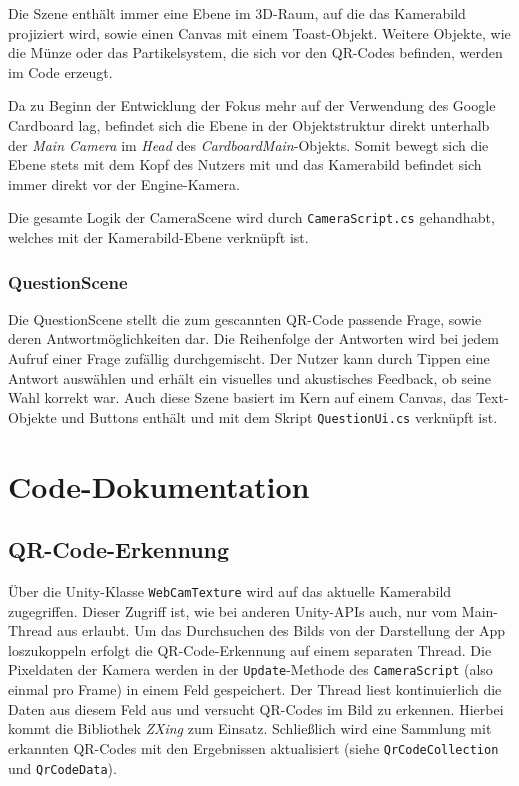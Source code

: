 Die Szene enthält immer eine Ebene im 3D-Raum, auf die das Kamerabild projiziert wird, sowie einen Canvas mit einem Toast-Objekt. Weitere Objekte, wie die Münze oder das Partikelsystem, die sich vor den QR-Codes befinden, werden im Code erzeugt.

Da zu Beginn der Entwicklung der Fokus mehr auf der Verwendung des Google Cardboard lag, befindet sich die Ebene in der Objektstruktur direkt unterhalb der \emph{Main Camera} im \emph{Head} des \emph{CardboardMain}-Objekts. Somit bewegt sich die Ebene stets mit dem Kopf des Nutzers mit und das Kamerabild befindet sich immer direkt vor der Engine-Kamera.

Die gesamte Logik der CameraScene wird durch \texttt{CameraScript.cs} gehandhabt, welches mit der Kamerabild-Ebene verknüpft ist.

\subsubsection{QuestionScene}
\label{subs:QuestionScene}
Die QuestionScene stellt die zum gescannten QR-Code passende Frage, sowie deren Antwortmöglichkeiten dar. Die Reihenfolge der Antworten wird bei jedem Aufruf einer Frage zufällig durchgemischt. Der Nutzer kann durch Tippen eine Antwort auswählen und erhält ein visuelles und akustisches Feedback, ob seine Wahl korrekt war. Auch diese Szene basiert im Kern auf einem Canvas, das Text-Objekte und Buttons enthält und mit dem Skript \texttt{QuestionUi.cs} verknüpft ist.

\section{Code-Dokumentation}
\subsection{QR-Code-Erkennung}
Über die Unity-Klasse \texttt{WebCamTexture} wird auf das aktuelle Kamerabild zugegriffen. Dieser Zugriff ist, wie bei anderen Unity-APIs auch, nur vom Main-Thread aus erlaubt. Um das Durchsuchen des Bilds von der Darstellung der App loszukoppeln erfolgt die QR-Code-Erkennung auf einem separaten Thread. Die Pixeldaten der Kamera werden in der \texttt{Update}-Methode des \texttt{CameraScript} (also einmal pro Frame) in einem Feld gespeichert. Der Thread liest kontinuierlich die Daten aus diesem Feld aus und versucht QR-Codes im Bild zu erkennen. Hierbei kommt die Bibliothek \emph{ZXing} zum Einsatz. Schließlich wird eine Sammlung mit erkannten QR-Codes mit den Ergebnissen aktualisiert (siehe \texttt{QrCodeCollection} und \texttt{QrCodeData}).

